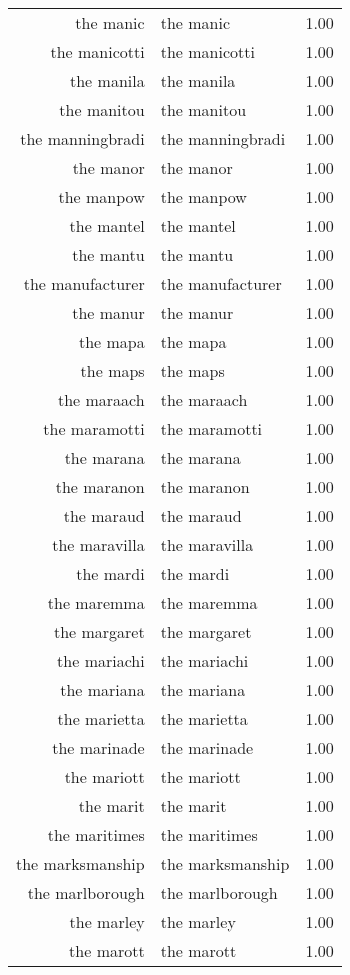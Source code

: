 \begin{table}[ht]
\begin{tabular}{rlr}
  the manic & the manic & 1.00 \\ 
  the manicotti & the manicotti & 1.00 \\ 
  the manila & the manila & 1.00 \\ 
  the manitou & the manitou & 1.00 \\ 
  the manningbradi & the manningbradi & 1.00 \\ 
  the manor & the manor & 1.00 \\ 
  the manpow & the manpow & 1.00 \\ 
  the mantel & the mantel & 1.00 \\ 
  the mantu & the mantu & 1.00 \\ 
  the manufacturer & the manufacturer & 1.00 \\ 
  the manur & the manur & 1.00 \\ 
  the mapa & the mapa & 1.00 \\ 
  the maps & the maps & 1.00 \\ 
  the maraach & the maraach & 1.00 \\ 
  the maramotti & the maramotti & 1.00 \\ 
  the marana & the marana & 1.00 \\ 
  the maranon & the maranon & 1.00 \\ 
  the maraud & the maraud & 1.00 \\ 
  the maravilla & the maravilla & 1.00 \\ 
  the mardi & the mardi & 1.00 \\ 
  the maremma & the maremma & 1.00 \\ 
  the margaret & the margaret & 1.00 \\ 
  the mariachi & the mariachi & 1.00 \\ 
  the mariana & the mariana & 1.00 \\ 
  the marietta & the marietta & 1.00 \\ 
  the marinade & the marinade & 1.00 \\ 
  the mariott & the mariott & 1.00 \\ 
  the marit & the marit & 1.00 \\ 
  the maritimes & the maritimes & 1.00 \\ 
  the marksmanship & the marksmanship & 1.00 \\ 
  the marlborough & the marlborough & 1.00 \\ 
  the marley & the marley & 1.00 \\ 
  the marott & the marott & 1.00 \\ 

\end{tabular}
\end{table}
